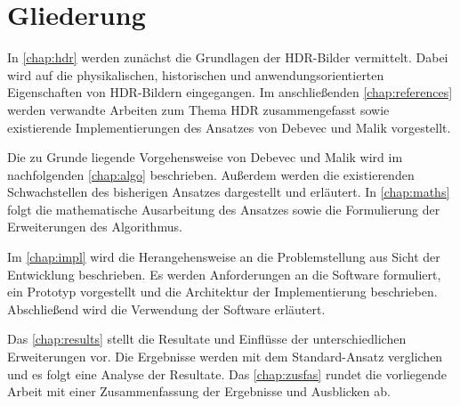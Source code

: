 \section{Gliederung}
In \autoref{chap:hdr} werden zunächst die Grundlagen der \gls{HDR}-Bilder vermittelt. Dabei wird auf die physikalischen, historischen und anwendungsorientierten Eigenschaften von \gls{HDR}-Bildern eingegangen. Im anschließenden \autoref{chap:references} werden verwandte Arbeiten zum Thema \gls{HDR} zusammengefasst sowie existierende Implementierungen des Ansatzes von Debevec und Malik vorgestellt.

Die zu Grunde liegende Vorgehensweise von Debevec und Malik wird im nachfolgenden \autoref{chap:algo} beschrieben. Außerdem werden die existierenden Schwachstellen des bisherigen Ansatzes dargestellt und erläutert. In \autoref{chap:maths} folgt die mathematische Ausarbeitung des Ansatzes sowie die Formulierung der Erweiterungen des Algorithmus.

Im \autoref{chap:impl} wird die Herangehensweise an die Problemstellung aus Sicht der Entwicklung beschrieben. Es werden Anforderungen an die Software formuliert, ein Prototyp vorgestellt und die Architektur der Implementierung beschrieben. Abschließend wird die Verwendung der Software erläutert.

Das \autoref{chap:results} stellt die Resultate und Einflüsse der unterschiedlichen Erweiterungen vor. Die Ergebnisse werden mit dem Standard-Ansatz verglichen und es folgt eine Analyse der Resultate.
Das \autoref{chap:zusfas} rundet die vorliegende Arbeit mit einer Zusammenfassung der Ergebnisse und Ausblicken ab. 
